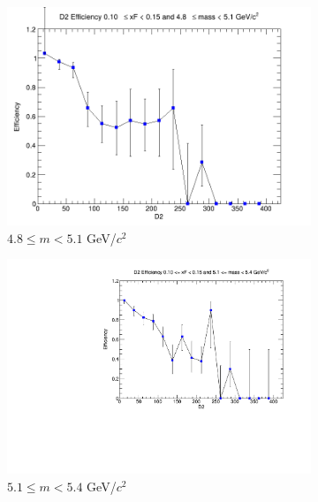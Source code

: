 \begin{figure}[p]
\begin{subfigure}[b]{0.32\textwidth}
        \centering
        \includegraphics[width=\textwidth]{./kTrackerEfficiencyPlots/D2_Efficiency_xF2_mass2.png}
        \caption{$4.8 \leq m < 5.1$ GeV/$c^2$}
        \label{fig:xF2_mass2}
    \end{subfigure}
    \vspace{0.5cm}
    \begin{subfigure}[b]{0.32\textwidth}
        \centering
        \includegraphics[width=\textwidth]{./kTrackerEfficiencyPlots/D2_Efficiency_xF2_mass3.pdf}
        \caption{$5.1 \leq m < 5.4$ GeV/$c^2$}
        \label{fig:xF2_mass3}
    \end{subfigure}
    \hfill
    \begin{subfigure}[b]{0.32\textwidth}
        \centering

\end{subfigure}
\end{figure}
